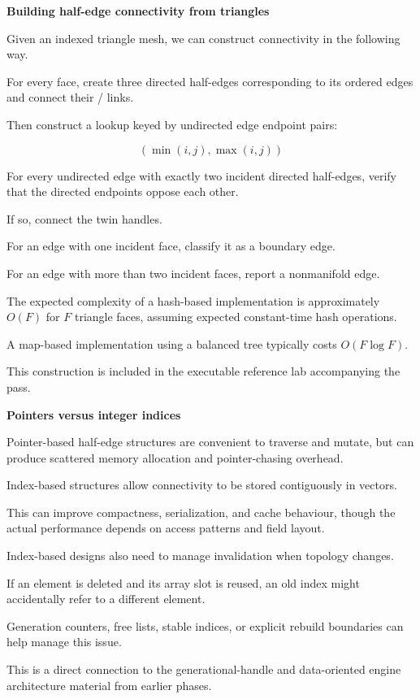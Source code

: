 \textbf{Building half-edge connectivity from triangles}

Given an indexed triangle mesh, we can construct connectivity in the following way.

For every face, create three directed half-edges corresponding to its ordered edges and connect their / links.

Then construct a lookup keyed by undirected edge endpoint pairs:

\[
(\min(i,j),\max(i,j))
\]

For every undirected edge with exactly two incident directed half-edges, verify that the directed endpoints oppose each other.

If so, connect the twin handles.

For an edge with one incident face, classify it as a boundary edge.

For an edge with more than two incident faces, report a nonmanifold edge.

The expected complexity of a hash-based implementation is approximately \(O(F)\) for \(F\) triangle faces, assuming expected constant-time hash operations.

A map-based implementation using a balanced tree typically costs \(O(F\log F)\).

This construction is included in the executable reference lab accompanying the pass.

\textbf{Pointers versus integer indices}

Pointer-based half-edge structures are convenient to traverse and mutate, but can produce scattered memory allocation and pointer-chasing overhead.

Index-based structures allow connectivity to be stored contiguously in vectors.

This can improve compactness, serialization, and cache behaviour, though the actual performance depends on access patterns and field layout.

Index-based designs also need to manage invalidation when topology changes.

If an element is deleted and its array slot is reused, an old index might accidentally refer to a different element.

Generation counters, free lists, stable indices, or explicit rebuild boundaries can help manage this issue.

This is a direct connection to the generational-handle and data-oriented engine architecture material from earlier phases.

